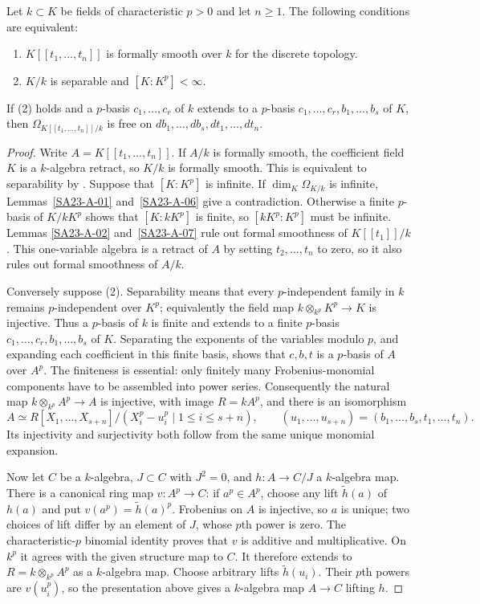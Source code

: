 \begin{theorem}\label{SA23-A-08}
Let $k\subset K$ be fields of characteristic $p>0$ and let $n\geq1$.
The following conditions are equivalent:
\begin{enumerate}
\item $K[[t_1,\ldots,t_n]]$ is formally smooth over $k$ for the
discrete topology.
\item $K/k$ is separable and $[K:K^p]<\infty$.
\end{enumerate}
If (2) holds and a $p$-basis $c_1,\ldots,c_r$ of $k$ extends to
a $p$-basis $c_1,\ldots,c_r,b_1,\ldots,b_s$ of $K$, then
$\Omega_{K[[t_1,\ldots,t_n]]/k}$ is free on
$db_1,\ldots,db_s,dt_1,\ldots,dt_n$.
\end{theorem}
\begin{proof}
Write $A=K[[t_1,\ldots,t_n]]$.  If $A/k$ is formally smooth, the
coefficient field $K$ is a $k$-algebra retract, so $K/k$ is formally
smooth.  This is equivalent to separability by
\cite[Tag 031U, Proposition 10.158.9]{rootStacksFields}.
Suppose that $[K:K^p]$ is infinite.  If $\dim_K\Omega_{K/k}$ is
infinite, Lemmas~\ref{SA23-A-01} and~\ref{SA23-A-06} give a
contradiction.  Otherwise a finite $p$-basis of $K/kK^p$ shows that
$[K:kK^p]$ is finite, so $[kK^p:K^p]$ must be infinite.  Lemmas
\ref{SA23-A-02} and~\ref{SA23-A-07} rule out formal smoothness
of $K[[t_1]]/k$.  This one-variable algebra is a retract of $A$
by setting $t_2,\ldots,t_n$ to zero, so it also rules out formal
smoothness of $A/k$.

Conversely suppose (2).  Separability means that every
$p$-independent family in $k$ remains $p$-independent over $K^p$;
equivalently the field map
$k\otimes_{k^p}K^p\to K$ is injective.  Thus a $p$-basis of $k$
is finite and extends to a finite $p$-basis $c_1,\ldots,c_r,b_1,
\ldots,b_s$ of $K$.  Separating the exponents of the variables
modulo $p$, and expanding each coefficient in this finite basis,
shows that $c,b,t$ is a $p$-basis of $A$ over $A^p$.
The finiteness is essential: only finitely many Frobenius-monomial
components have to be assembled into power series.
Consequently the natural map $k\otimes_{k^p}A^p\to A$ is
injective, with image $R=kA^p$, and there is an isomorphism
\[
 A\simeq
 R[X_1,\ldots,X_{s+n}]/(X_i^p-u_i^p\mid1\leq i\leq s+n),
 \qquad (u_1,\ldots,u_{s+n})=(b_1,\ldots,b_s,t_1,\ldots,t_n).
\]
Its injectivity and surjectivity both follow from the same unique
monomial expansion.

Now let $C$ be a $k$-algebra, $J\subset C$ with $J^2=0$, and
$h:A\to C/J$ a $k$-algebra map.  There is a canonical ring map
$v:A^p\to C$: if $a^p\in A^p$, choose any lift $\widetilde h(a)$
of $h(a)$ and put $v(a^p)=\widetilde h(a)^p$.
Frobenius on $A$ is injective, so $a$ is unique; two choices of
lift differ by an element of $J$, whose $p$th power is zero.
The characteristic-$p$ binomial identity proves that $v$ is additive
and multiplicative.  On $k^p$ it agrees with the given structure
map to $C$.  It therefore extends to $R=k\otimes_{k^p}A^p$ as a
$k$-algebra map.  Choose arbitrary lifts $\widetilde h(u_i)$.
Their $p$th powers are $v(u_i^p)$, so the presentation above gives
a $k$-algebra map $A\to C$ lifting $h$.


\end{proof}
